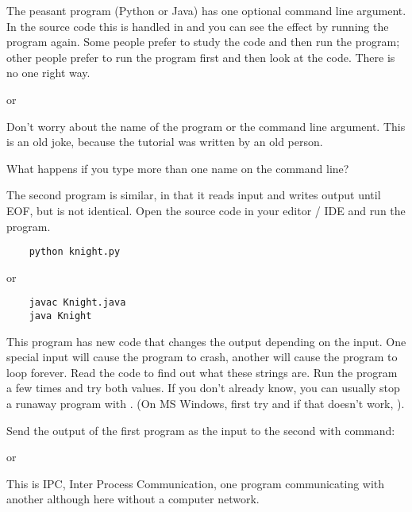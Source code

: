 The peasant program (Python or Java) has one optional command line argument.
In the source code this is handled in  and you can see the effect
by running the program again. Some people prefer to study the code and then run the
program; other people prefer to run the program first and then look at the code.
There is no one right way.

or

\begin{IMPORTANT}
Don't worry about the name of the program or the command line argument. This is an
old joke, because the tutorial was written by an old person.
\end{IMPORTANT}

What happens if you type more than one name on the command line?



The second program is similar, in that it reads input and writes output until EOF,
but is not identical. Open the source code in your editor / IDE and run the program.

\begin{CODE}\begin{verbatim}
    python knight.py
\end{verbatim}\end{CODE}
or
\begin{CODE}\begin{verbatim}
    javac Knight.java
    java Knight
\end{verbatim}\end{CODE}

This program has new  code that changes the output depending
on the input. One special input will cause the program to crash, another will
cause the program to loop forever. Read the code to find out what these strings
are. Run the program a few times and try both values. If you don't already know,
you can usually stop a runaway program with . (On MS Windows, first
try  and if that doesn't work, ).



Send the output of the first program as the input to the second with command:

or

This is IPC, Inter Process Communication, one program communicating with another
although here without a computer network.

